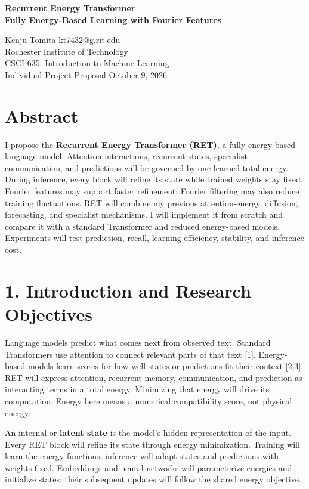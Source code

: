 \documentclass[11pt,letterpaper]{article}
\begin{document}
\begin{center}
{\Large\bfseries Recurrent Energy Transformer\\Fully Energy-Based Learning with Fourier Features}\par
\vspace{3pt}
Kenju Tomita \quad \href{mailto:kt7432@g.rit.edu}{kt7432@g.rit.edu}\\
Rochester Institute of Technology\\
CSCI 635: Introduction to Machine Learning\\
Individual Project Proposal \quad October 9, 2026
\end{center}

\section*{Abstract}

I propose the \textbf{Recurrent Energy Transformer (RET)}, a fully energy-based language model. Attention interactions, recurrent states, specialist communication, and predictions will be governed by one learned total energy. During inference, every block will refine its state while trained weights stay fixed. Fourier features may support faster refinement; Fourier filtering may also reduce training fluctuations. RET will combine my previous attention-energy, diffusion, forecasting, and specialist mechanisms. I will implement it from scratch and compare it with a standard Transformer and reduced energy-based models. Experiments will test prediction, recall, learning efficiency, stability, and inference cost.

\section*{1. Introduction and Research Objectives}

Language models predict what comes next from observed text. Standard Transformers use attention to connect relevant parts of that text [1]. Energy-based models learn scores for how well states or predictions fit their context [2,3]. RET will express attention, recurrent memory, communication, and prediction as interacting terms in a total energy. Minimizing that energy will drive its computation. Energy here means a numerical compatibility score, not physical energy.

An internal or \textbf{latent state} is the model's hidden representation of the input. Every RET block will refine its state through energy minimization. Training will learn the energy functions; inference will adapt states and predictions with weights fixed. Embeddings and neural networks will parameterize energies and initialize states; their subsequent updates will follow the shared energy objective.
\end{document}

